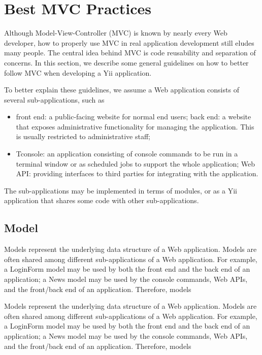 \chapter{Best MVC Practices}

Although Model-View-Controller (MVC) is known by nearly every Web developer, how to properly use MVC in real application development still eludes many people. The central idea behind MVC is code reusability and separation of concerns. In this section, we describe some general guidelines on how to better follow MVC when developing a Yii application.

To better explain these guidelines, we assume a Web application consists of several sub-applications, such as
\begin{itemize}
\item front end: a public-facing website for normal end users;
back end: a website that exposes administrative functionality for managing the application. This is usually restricted to administrative staff;
\item Tconsole: an application consisting of console commands to be run in a terminal window or as scheduled jobs to support the whole application;
Web API: providing interfaces to third parties for integrating with the application.
\end{itemize}

The sub-applications may be implemented in terms of modules, or as a Yii application that shares some code with other sub-applications.


\section{Model}

Models represent the underlying data structure of a Web application. Models are often shared among different sub-applications of a Web application. For example, a LoginForm model may be used by both the front end and the back end of an application; a News model may be used by the console commands, Web APIs, and the front/back end of an application. Therefore, models

Models represent the underlying data structure of a Web application. Models are often shared among different sub-applications of a Web application. For example, a LoginForm model may be used by both the front end and the back end of an application; a News model may be used by the console commands, Web APIs, and the front/back end of an application. Therefore, models

